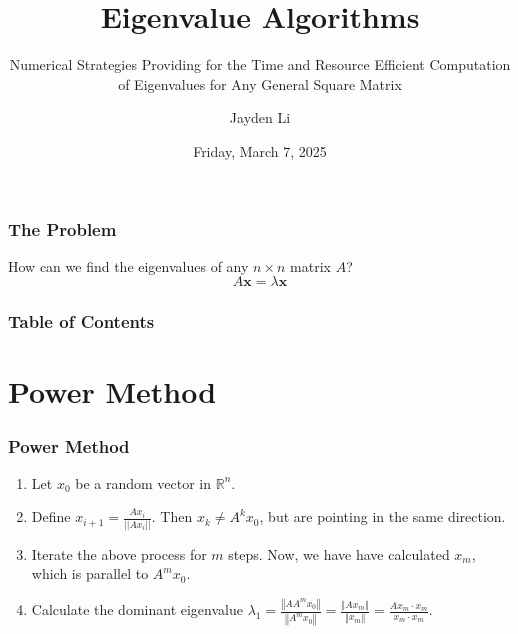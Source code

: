 \documentclass{beamer}
\title{Eigenvalue Algorithms}
\subtitle{Numerical Strategies Providing for the Time and Resource Efficient Computation of Eigenvalues for Any General Square Matrix}
\author{Jayden Li}
\date{Friday, March 7, 2025}
\begin{document}
\frame{\titlepage}

\begin{frame}
\frametitle{The Problem}

\begin{center}
	\begin{tcolorbox}[colback=yellow!5!white,colframe=yellow!75!black,parbox=false,width=0.6\linewidth]
		\centering
		How can we find the eigenvalues of any $n\times n$ matrix $A$?
		\begin{equation*}
			A\mathbf x=\lambda\mathbf x
		\end{equation*}
	\end{tcolorbox}
\end{center}

\end{frame}

\begin{frame}
	\frametitle{Table of Contents}
	\tableofcontents
\end{frame}

\section{Power Method}
\frame{\sectionpage}

\begin{frame}
	\frametitle{Power Method}
	\begin{tcolorbox}[title={Power Method},colback=red!5!white,colframe=red!75!black,parbox=false]
		\begin{enumerate}
			\item<1-> Let $x_0$ be a random vector in $\mathbb R^n$.
			\item<2-> Define $\displaystyle x_{i+1}=\frac{Ax_i}{||Ax_i||}$. Then $x_k\neq A^kx_0$, but are pointing in the same direction.
			\item<3-> Iterate the above process for $m$ steps. Now, we have have calculated $x_m$, which is parallel to $A^m x_0$.
			\item<4-> Calculate the dominant eigenvalue $\displaystyle \lambda_1=\frac{\left\Vert A A^m x_0 \right\Vert}{\left\Vert A^m x_0 \right\Vert}=\frac{\left\Vert A x_m\right\Vert}{\left\Vert x_m \right\Vert}=\frac{Ax_m\cdot x_m}{x_m \cdot x_m}$.
		\end{enumerate}
	\end{tcolorbox}
\end{frame}
\end{document}
